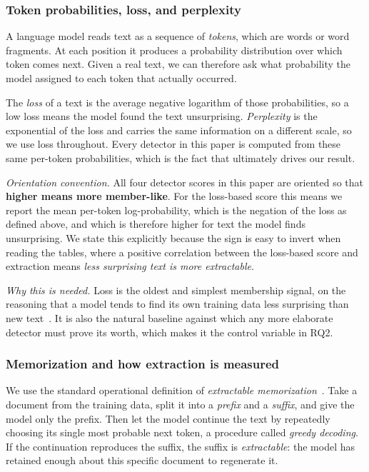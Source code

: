 \subsubsection{Token probabilities, loss, and perplexity}
A language model reads text as a sequence of \emph{tokens}, which are words or word
fragments. At each position it produces a probability distribution over which token comes
next. Given a real text, we can therefore ask what probability the model assigned to each
token that actually occurred.

The \emph{loss} of a text is the average negative logarithm of those probabilities, so a
low loss means the model found the text unsurprising. \emph{Perplexity} is the exponential
of the loss and carries the same information on a different scale, so we use loss
throughout. Every detector in this paper is computed from these same per-token
probabilities, which is the fact that ultimately drives our result.

\emph{Orientation convention.} All four detector scores in this paper are oriented so that
\textbf{higher means more member-like}. For the loss-based score this means we report the
mean per-token log-probability, which is the negation of the loss as defined above, and
which is therefore higher for text the model finds unsurprising. We state this explicitly
because the sign is easy to invert when reading the tables, where a positive correlation
between the loss-based score and extraction means \emph{less surprising text is more
extractable}.

\emph{Why this is needed.} Loss is the oldest and simplest membership signal, on the
reasoning that a model tends to find its own training data less surprising than new
text~\citep{yeom2018privacy}. It is also the natural baseline against which any more
elaborate detector must prove its worth, which makes it the control variable in RQ2.

\subsubsection{Memorization and how extraction is measured}
We use the standard operational definition of \emph{extractable
memorization}~\citep{carlini2023quantifying}. Take a document from the training data,
split it into a \emph{prefix} and a \emph{suffix}, and give the model only the prefix.
Then let the model continue the text by repeatedly choosing its single most probable next
token, a procedure called \emph{greedy decoding}. If the continuation reproduces the
suffix, the suffix is \emph{extractable}: the model has retained enough about this
specific document to regenerate it.

